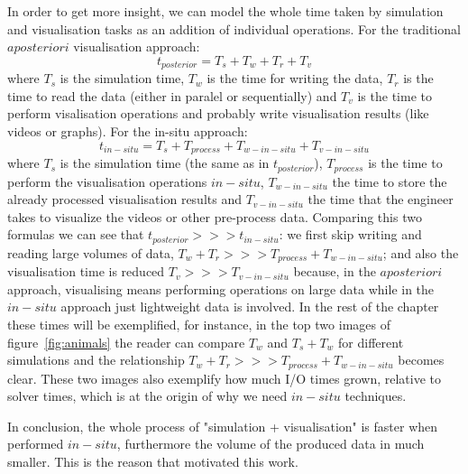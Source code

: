 In order to get more insight, we can model the whole time taken by simulation
and visualisation tasks as an addition of individual operations. For the
traditional $a posteriori$ visualisation approach:
\begin{equation}
  t_{posterior} = T_s + T_w  + T_r + T_v
  \label{eq:first}
\end{equation}
where $T_s$ is the simulation time, $T_w$ is the time for writing the data,
$T_r$ is the time to read the data (either in paralel or sequentially) and $T_v$
is the time to perform visalisation operations and probably write visualisation
results (like videos or graphs). For the in-situ approach:
\begin{equation}
t_{in-situ} = T_s + T_{process} + T_{w-in-situ} + T_{v-in-situ}
  \label{eq:second}
\end{equation}
where $T_s$ is the simulation time (the same as in $t_{posterior}$),
$T_{process}$
is the time to perform the visualisation operations $in-situ$, $T_{w-in-situ}$
the time to store the already processed visualisation results and
$T_{v-in-situ}$ the time that the engineer takes to visualize the videos or
other pre-process data. Comparing this two formulas we can see that
$t_{posterior} >>> t_{in-situ}$: we first skip writing and reading large volumes
of data, $T_w  + T_r >>> T_{process} + T_{w-in-situ}$; and also the
visualisation time is reduced $T_v >>> T_{v-in-situ}$ because, in the $a
posteriori$ approach, visualising means performing operations on large data
while in the $in-situ$ approach just lightweight data is involved.  In the rest
of the chapter these times will be exemplified, for instance, in the top two
images of figure~\ref{fig:animals} the reader can compare $T_w$ and $T_s + T_w$ for different
simulations and the relationship $T_w  + T_r >>> T_{process} + T_{w-in-situ}$
becomes clear. These two images also exemplify how much I/O times grown,
relative to solver times, which is at the origin of why we need $in-situ$
techniques.

In conclusion, the whole process of "simulation + visualisation" is faster when
performed $in-situ$, furthermore the volume of the produced data in much
smaller. This is the reason that motivated this work.




